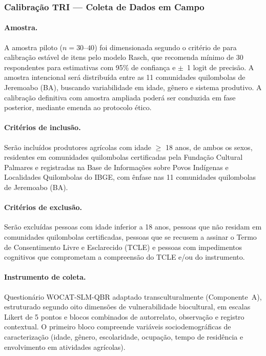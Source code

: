 \documentclass[12pt,a4paper,brazil]{article}
\begin{document}
\subsubsection{Calibração TRI --- Coleta de Dados em Campo}

\paragraph{Amostra.} A amostra piloto ($n = 30$--$40$) foi dimensionada segundo o critério de \citet{Linacre1994} para calibração estável de itens pelo modelo Rasch, que recomenda mínimo de 30 respondentes para estimativas com 95\% de confiança e $\pm$~1 logit de precisão. A amostra intencional será distribuída entre as 11 comunidades quilombolas de Jeremoabo (BA), buscando variabilidade em idade, gênero e sistema produtivo. A calibração definitiva com amostra ampliada poderá ser conduzida em fase posterior, mediante emenda ao protocolo ético.

\paragraph{Critérios de inclusão.} Serão incluídos produtores agrícolas com idade $\geq$ 18 anos, de ambos os sexos, residentes em comunidades quilombolas certificadas pela Fundação Cultural Palmares e registradas na Base de Informações sobre Povos Indígenas e Localidades Quilombolas do IBGE, com ênfase nas 11 comunidades quilombolas de Jeremoabo (BA).

\paragraph{Critérios de exclusão.} Serão excluídas pessoas com idade inferior a 18 anos, pessoas que não residam em comunidades quilombolas certificadas, pessoas que se recusem a assinar o Termo de Consentimento Livre e Esclarecido (TCLE) e pessoas com impedimentos cognitivos que comprometam a compreensão do TCLE e/ou do instrumento.

\paragraph{Instrumento de coleta.} Questionário WOCAT-SLM-QBR adaptado transculturalmente (Componente~A), estruturado segundo oito dimensões de vulnerabilidade biocultural, em escalas Likert de 5 pontos e blocos combinados de autorrelato, observação e registro contextual. O primeiro bloco compreende variáveis sociodemográficas de caracterização (idade, gênero, escolaridade, ocupação, tempo de residência e envolvimento em atividades agrícolas).
\end{document}
